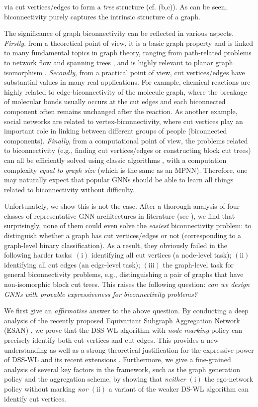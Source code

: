 \documentclass{article}
\let\cref\crtcref
\begin{document}
via cut vertices/edges to form a \emph{tree} structure (cf. \cref{fig:block_cut_tree}(b,c)). As can be seen, biconnectivity purely captures the intrinsic structure of a graph.

The significance of graph biconnectivity can be reflected in various aspects. \emph{Firstly}, from a theoretical point of view, it is a basic graph property and is linked to many fundamental topics in graph theory, ranging from path-related problems to network flow  and spanning trees , and is highly relevant to planar graph isomorphism . 
\emph{Secondly}, from a practical point of view, cut vertices/edges have substantial values in many real applications. For example, chemical reactions are highly related to edge-biconnectivity of the molecule graph, where the breakage of molecular bonds usually occurs at the cut edges and each biconnected component often remains unchanged after the reaction. As another example, social networks are related to vertex-biconnectivity, where cut vertices play an important role in linking between different groups of people (biconnected components). 
\emph{Finally}, from a computational point of view, the problems related to biconnectivity (e.g., finding cut vertices/edges or constructing block cut trees) can all be efficiently solved using classic algorithms , with a computation complexity \emph{equal to graph size} (which is the same as an MPNN). Therefore, one may naturally expect that popular GNNs should be able to learn all things related to biconnectivity without difficulty.

Unfortunately, we show this is not the case. After a thorough analysis of four classes of representative GNN architectures in literature (see \cref{sec:counterexamples}), we find that surprisingly, none of them could even solve the \emph{easiest} biconnectivity problem: to distinguish whether a graph has cut vertices/edges or not (corresponding to a graph-level binary classification). As a result, they obviously failed in the following harder tasks: $(\mathrm{i})$ identifying all cut vertices (a node-level task); $(\mathrm{ii})$ identifying all cut edges (an edge-level task); $(\mathrm{iii})$ the graph-level task for general biconnectivity problems, e.g., distinguishing a pair of graphs that have non-isomorphic block cut trees. This raises the following question: \emph{can we design GNNs with provable expressiveness for biconnectivity problems?}

We first give an \emph{affirmative} answer to the above question. By conducting a deep analysis of the recently proposed Equivariant Subgraph Aggregation Network (ESAN) , we prove that the DSS-WL algorithm with \emph{node marking} policy can precisely identify both cut vertices and cut edges. This provides a new understanding as well as a strong theoretical justification for the expressive power of DSS-WL and its recent extensions . Furthermore, we give a fine-grained analysis of several key factors in the framework, such as the graph generation policy and the aggregation scheme, by showing that \emph{neither} $(\mathrm{i})$ the ego-network policy without marking \emph{nor} $(\mathrm{ii})$ a variant of the weaker DS-WL algorithm can identify cut vertices. 
\end{document}
